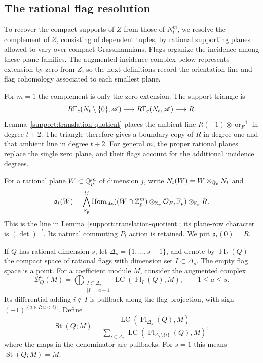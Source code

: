 \subsection{The rational flag resolution}

To recover the compact supports of $Z$ from those of $N_t^m$, we resolve
the complement of $Z$, consisting of dependent tuples, by rational supporting planes allowed
to vary over compact Grassmannians. Flags organize the incidence among these
plane families. The augmented incidence complex below represents extension
by zero from $Z$, so the next definitions record the orientation line and
flag cohomology associated to each smallest plane.

For $m=1$ the complement is only the zero extension.  The support
triangle is
\[
 R\Gamma_c(N_t\setminus\{0\},\mathscr A)
 \longrightarrow R\Gamma_c(N_t,\mathscr A)
 \longrightarrow R.
\]
Lemma~\ref{support:translation-quotient} places the ambient line
$R(-1)\otimes\operatorname{or}_F^{-1}$ in degree $t+2$.
The triangle therefore gives a boundary copy of $R$ in degree one
and that ambient line in degree $t+2$.  For general $m$, the
proper rational planes replace the single zero plane, and their
flags account for the additional incidence degrees.

For a rational plane $W\subset\mathbb Q_p^m$ of dimension $j$, write
$N_t(W)=W\otimes_{\mathbb Q_p}N_t$ and
\[
 \mathfrak o_t(W)=
 \bigwedge^{tj}_{\mathbb F_p}
 \operatorname{Hom}_{\mathrm{cts}}((W\cap\mathbb Z_p^m)\otimes_{\mathbb Z_p}\mathcal O_F,\mathbb F_p)
 \otimes_{\mathbb F_p}R.
\]
This is the line in Lemma~\ref{support:translation-quotient}; its
plane-row character is $(\det)^{-t}$.  Its natural commuting $P_t$
action is retained.  We put $\mathfrak o_t(0)=R$.

If $Q$ has rational dimension $s$, let
$\Delta_s=\{1,\ldots,s-1\}$, and denote by
$\operatorname{Fl}_I(Q)$ the compact space of rational flags with
dimension set $I\subset\Delta_s$.  The empty flag space is a point.
For a coefficient module $M$, consider the augmented complex
\begin{equation}\label{support:flag-complex-definition}
 \mathcal B_Q^a(M)=
 \bigoplus_{\substack{I\subset\Delta_s\\|I|=a-1}}
 \operatorname{LC}(\operatorname{Fl}_I(Q),M),
 \qquad 1\leq a\leq s.
\end{equation}
Its differential adding $i\notin I$ is pullback along the flag
projection, with sign $(-1)^{|\{u\in I:u<i\}|}$.
Define
\[
 \operatorname{St}(Q;M)=
 \frac{\operatorname{LC}(\operatorname{Fl}_{\Delta_s}(Q),M)}
 {\displaystyle\sum_{i\in\Delta_s}
   \operatorname{LC}(\operatorname{Fl}_{\Delta_s\setminus\{i\}}(Q),M)},
\]
where the maps in the denominator are pullbacks.
For $s=1$ this means $\operatorname{St}(Q;M)=M$.

